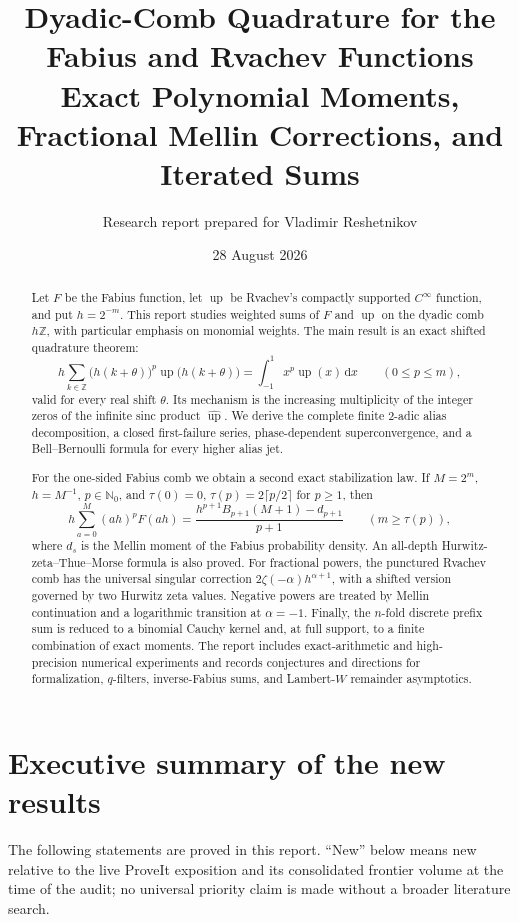 \documentclass[11pt]{article}
\title{\bfseries Dyadic-Comb Quadrature for the Fabius and Rvachev Functions\\[0.4em]
\large Exact Polynomial Moments, Fractional Mellin Corrections, and Iterated Sums}
\author{Research report prepared for Vladimir Reshetnikov}
\date{28 August 2026}
\theoremstyle{definition}
\newcommand{\Up}{\operatorname{up}}
\newcommand{\dd}{\,\mathrm{d}}
\newcommand{\Z}{\mathbb{Z}}
\newcommand{\N}{\mathbb{N}}
\begin{document}
\maketitle

\begin{abstract}
Let $F$ be the Fabius function, let $\Up$ be Rvachev's compactly supported
$C^\infty$ function, and put $h=2^{-m}$.  This report studies weighted sums of
$F$ and $\Up$ on the dyadic comb $h\Z$, with particular emphasis on monomial
weights.  The main result is an exact shifted quadrature theorem:
\[
 h\sum_{k\in\Z}\bigl(h(k+\theta)\bigr)^p
 \Up\bigl(h(k+\theta)\bigr)
 =\int_{-1}^{1}x^p\Up(x)\dd x
 \qquad(0\le p\le m),
\]
valid for every real shift $\theta$.  Its mechanism is the increasing
multiplicity of the integer zeros of the infinite sinc product
$\widehat{\Up}$.  We derive the complete finite $2$-adic alias decomposition,
a closed first-failure series, phase-dependent superconvergence, and a
Bell--Bernoulli formula for every higher alias jet.

For the one-sided Fabius comb we obtain a second exact stabilization law.  If
$M=2^m$, $h=M^{-1}$, $p\in\N_0$, and
$\tau(0)=0$, $\tau(p)=2\lceil p/2\rceil$ for $p\ge1$, then
\[
 h\sum_{a=0}^{M}(ah)^pF(ah)
 =\frac{h^{p+1}B_{p+1}(M+1)-d_{p+1}}{p+1}
 \qquad(m\ge\tau(p)),
\]
where $d_s$ is the Mellin moment of the Fabius probability density.  An
all-depth Hurwitz-zeta--Thue--Morse formula is also proved.  For fractional
powers, the punctured Rvachev comb has the universal singular correction
$2\zeta(-\alpha)h^{\alpha+1}$, with a shifted version governed by two Hurwitz
zeta values.  Negative powers are treated by Mellin continuation and a
logarithmic transition at $\alpha=-1$.  Finally, the $n$-fold discrete prefix
sum is reduced to a binomial Cauchy kernel and, at full support, to a finite
combination of exact moments.  The report includes exact-arithmetic and
high-precision numerical experiments and records conjectures and directions
for formalization, $q$-filters, inverse-Fabius sums, and Lambert-$W$ remainder
asymptotics.
\end{abstract}

\tableofcontents

\section{Executive summary of the new results}

The following statements are proved in this report.  ``New'' below means new
relative to the live ProveIt exposition and its consolidated frontier volume
at the time of the audit; no universal priority claim is made without a
broader literature search.
\end{document}
